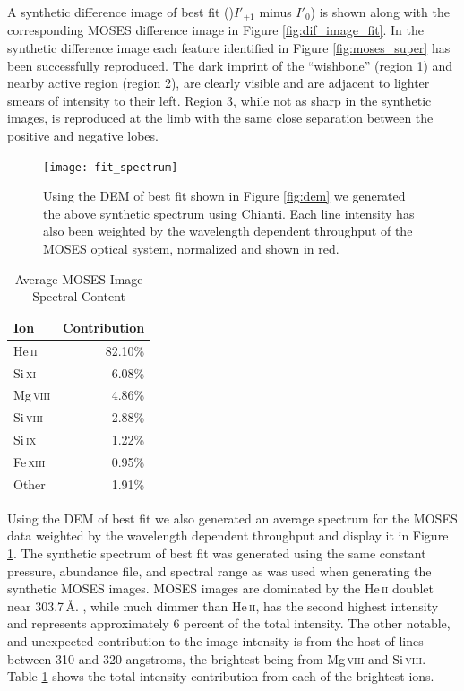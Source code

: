 	A synthetic difference image of best fit ()$I'_{+1}$ minus $I'_0$) is shown along with the corresponding MOSES difference image in Figure \ref{fig:dif_image_fit}.
	In the synthetic difference image each feature identified in Figure \ref{fig:moses_super} has been successfully reproduced.
	The dark imprint of the ``wishbone'' (region 1) and nearby active region (region 2), are clearly visible and are adjacent to lighter smears of intensity to their left.
	Region 3, while not as sharp in the synthetic images, is reproduced at the limb with the same close separation between the positive and negative lobes.
	
	\begin{figure}
		\centering
		\texttt{[image: fit\_spectrum]}
		\caption{Using the DEM of best fit shown in Figure \ref{fig:dem} we generated the above synthetic spectrum using Chianti. Each line intensity has also been weighted by the wavelength dependent throughput of the MOSES optical system, normalized and shown in red.}
		\label{fig:spectrum}
	\end{figure}
	\begin{table}
		\begin{center}
			\caption{Average MOSES Image Spectral Content}
			\label{table:spectral_content}
			\begin{tabular}{l|r}
				\hline
				Ion & Contribution \\
				\hline
				He\,\textsc{ii} & 82.10\% \\
				Si\,\textsc{xi} & 6.08\% \\
				Mg\,\textsc{viii} & 4.86\% \\
				Si\,\textsc{viii} & 2.88\% \\
				Si\,\textsc{ix} & 1.22\% \\
				Fe\,\textsc{xiii} & 0.95\% \\
				Other & 1.91\% \\ 
				\hline
			\end{tabular}
		\end{center}
	\end{table} 
	
	
	Using the DEM of best fit we also generated an average spectrum for the MOSES data weighted by the wavelength dependent throughput and display it in Figure \ref{fig:spectrum}.
	The synthetic spectrum of best fit was generated using the same constant pressure, abundance file, and spectral range as was used when generating the synthetic MOSES images.
	MOSES images are dominated by the He\,\textsc{ii} doublet near 303.7\,\AA.
	\sixi, while much dimmer than He\,\textsc{ii}, has the second highest intensity and represents approximately 6 percent of the total intensity.
	The other notable, and unexpected contribution to the image intensity is from the host of lines between 310 and 320 angstroms, the brightest being from Mg\,\textsc{viii} and Si\,\textsc{viii}.
	Table \ref{table:spectral_content} shows the total intensity contribution from each of the brightest ions.  
	

